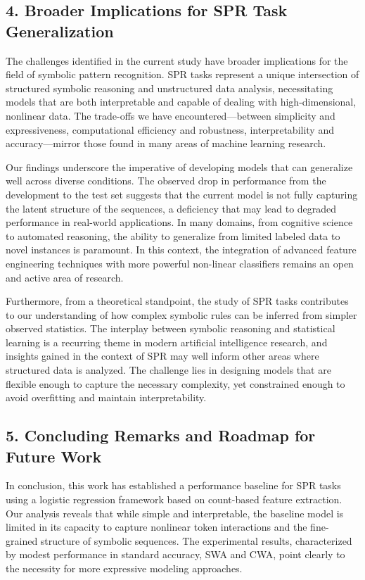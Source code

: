 \documentclass{article}
\begin{document}
\subsection*{4. Broader Implications for SPR Task Generalization}
The challenges identified in the current study have broader implications for the field of symbolic pattern recognition. SPR tasks represent a unique intersection of structured symbolic reasoning and unstructured data analysis, necessitating models that are both interpretable and capable of dealing with high-dimensional, nonlinear data. The trade-offs we have encountered—between simplicity and expressiveness, computational efficiency and robustness, interpretability and accuracy—mirror those found in many areas of machine learning research.

Our findings underscore the imperative of developing models that can generalize well across diverse conditions. The observed drop in performance from the development to the test set suggests that the current model is not fully capturing the latent structure of the sequences, a deficiency that may lead to degraded performance in real-world applications. In many domains, from cognitive science to automated reasoning, the ability to generalize from limited labeled data to novel instances is paramount. In this context, the integration of advanced feature engineering techniques with more powerful non-linear classifiers remains an open and active area of research.

Furthermore, from a theoretical standpoint, the study of SPR tasks contributes to our understanding of how complex symbolic rules can be inferred from simpler observed statistics. The interplay between symbolic reasoning and statistical learning is a recurring theme in modern artificial intelligence research, and insights gained in the context of SPR may well inform other areas where structured data is analyzed. The challenge lies in designing models that are flexible enough to capture the necessary complexity, yet constrained enough to avoid overfitting and maintain interpretability.

\subsection*{5. Concluding Remarks and Roadmap for Future Work}
In conclusion, this work has established a performance baseline for SPR tasks using a logistic regression framework based on count-based feature extraction. Our analysis reveals that while simple and interpretable, the baseline model is limited in its capacity to capture nonlinear token interactions and the fine-grained structure of symbolic sequences. The experimental results, characterized by modest performance in standard accuracy, SWA and CWA, point clearly to the necessity for more expressive modeling approaches.
\end{document}
